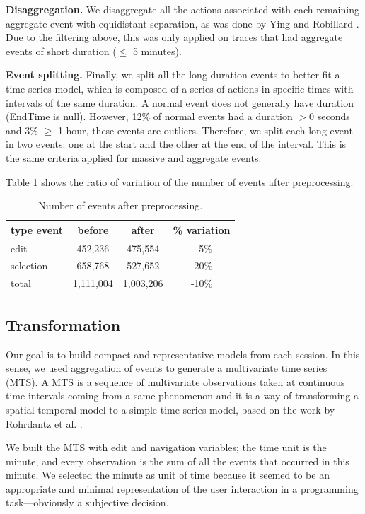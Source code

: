 \documentclass[times]{smrauth}
\begin{document}
\textbf{Disaggregation.} We disaggregate all the actions associated with each remaining aggregate event with equidistant separation, as was done by Ying and Robillard \cite{YR11}. Due to the filtering above, this was only applied on traces that had aggregate events of short duration ($\leq$ 5 minutes).

\textbf{Event splitting.} Finally, we split all the long duration events to better fit a time series model, which is composed of a series of actions in specific times with intervals of the same duration. A normal event does not generally have duration (EndTime is null). However, 12\% of normal events  had a duration $> 0$ seconds and 3\% $\geq$ 1 hour, these events are outliers. Therefore, we split each long event in two events: one at the start and the other at the end of the interval. This is the same criteria applied for massive and aggregate events.

Table \ref{tbl:mass_events} shows the ratio of variation of the number of events after preprocessing.

\begin{table}[hb!]
	\small
	\renewcommand{\arraystretch}{1.3}
	\caption{Number of events after preprocessing.}
	\label{tbl:mass_events}
	\centering
	\begin{tabular}{l | c | c | c } 
		type event & before & after & \% variation  \\  
		\hline 
		edit &	 452,236 & 475,554 &	+5\%   \\
		selection &	658,768 & 527,652 & -20\%   \\
		\hline
		total & 1,111,004 & 1,003,206 & -10\%  \\
	\end{tabular}
\end{table}

\subsection{Transformation}
Our goal is to build compact and representative models from each session. In this sense, we used aggregation of events to generate a multivariate time series (MTS). A MTS is a sequence of multivariate observations taken at continuous time intervals coming from a same phenomenon and it is a way of transforming a spatial-temporal model to a simple time series model, based on the work by Rohrdantz et al. \cite{RHD12}.  

We built the MTS with edit and navigation variables; the time unit is the minute, and every observation is the sum of all the events that occurred in this minute. We selected the minute as unit of time because it seemed to be an appropriate and minimal representation of the user interaction in a programming task---obviously a subjective decision. 
\end{document}

